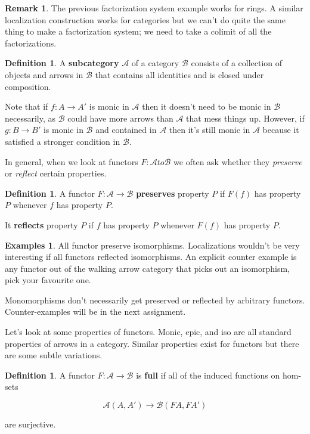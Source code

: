 \documentclass[11pt]{amsart}
\theoremstyle{plain}
\theoremstyle{definition}
\newtheorem{rem}[thm]{Remark}
\newtheorem{defn}[thm]{Definition}
\newtheorem*{egs*}{Examples}
\newcommand{\cA}{{\mathcal A}}
\newcommand{\cB}{{\mathcal B}}
\newcommand{\noi}{{\noindent}}
\begin{document}
\begin{rem}
The previous factorization system example works for rings. A similar localization construction works for categories but we can't do quite the same thing to make a factorization system; we need to take a colimit of all the factorizations. 
\end{rem}

\begin{defn}
A \textbf{subcategory} $\cA$ of a category $\cB$ consists of a collection of objects and arrows in $\cB$ that contains all identities and is closed under composition. 
\end{defn}

Note that if $f : A \to A'$ is monic in $\cA$ then it doesn't need to be monic in $\cB$ necessarily, as $\cB$ could have more arrows than $\cA$ that mess things up. However, if $g : B \to B'$ is monic in $\cB$ and contained in $\cA$ then it's still monic in $\cA$ because it satisfied a stronger condition in $\cB$. \medskip 

In general, when we look at functors $F: \cA to \cB$ we often ask whether they \textit{preserve} or \textit{reflect} certain properties. 

\begin{defn}
A functor $F : \cA \to \cB$ \textbf{preserves} property $P$ if $F(f)$ has property $P$ whenever $f$ has property $P$. \medskip 

It \textbf{reflects} property $P$ if $f$ has property $P$ whenever $F(f)$ has property $P$. 
\end{defn}

\begin{egs*}
All functor preserve isomorphisms. Localizations wouldn't be very interesting if all functors reflected isomorphisms. An explicit counter example is any functor out of the walking arrow category that picks out an isomorphism, pick your favourite one. \medskip 

Monomorphisms don't necessarily get preserved or reflected by arbitrary functors. Counter-examples will be in the next assignment.\medskip 
\end{egs*}

\noi Let's look at some properties of functors. Monic, epic, and iso are all standard properties of arrows in a category. Similar properties exist for functors but there are some subtle variations. 

\begin{defn}
A functor $F : \cA \to \cB$ is \textbf{full} if all of the induced functions on hom-sets 

\[ \cA(A, A') \to \cB(FA, FA')\]

\noi are surjective. 
\end{defn}
\end{document}
